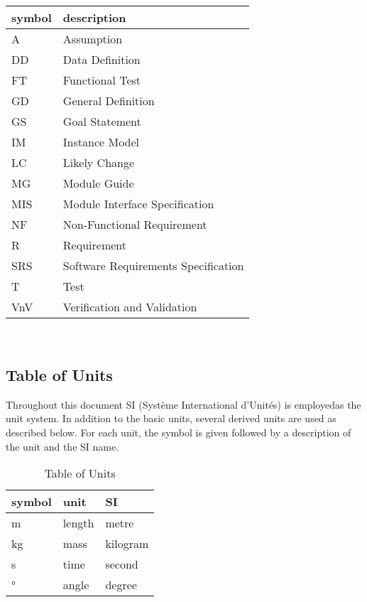 \documentclass[12pt, titlepage]{article}
\begin{document}
\renewcommand{\arraystretch}{1.2}
\begin{tabular}{l l} 
  \toprule		
  \textbf{symbol} & \textbf{description}\\
  \midrule 
  A & Assumption\\
  DD & Data Definition\\
  FT & Functional Test \\
  GD & General Definition\\
  GS & Goal Statement\\
  IM & Instance Model\\
  LC & Likely Change\\
  MG & Module Guide\\ 
  MIS & Module Interface Specification\\ 
  NF & Non-Functional Requirement\\
  R & Requirement\\
  SRS & Software Requirements Specification\\
  T & Test\\
  VnV & Verification and Validation\\ 
  \bottomrule
\end{tabular}\\

\subsection{Table of Units}

Throughout this document SI (Syst\`{e}me International d'Unit\'{e}s) is
employedas the unit system. In addition to the basic units, several derived
units are
used as described below.  For each unit, the symbol is given followed by a
description of the unit and the SI name.\\

\renewcommand{\arraystretch}{1.2}
\begin{table}[h!]
	\centering
\begin{center}
  \noindent \begin{tabular}{l l l} 
    \toprule		
    \textbf{symbol} & \textbf{unit} & \textbf{SI}\\
    \midrule 
    \si{\metre} & length & metre\\
    \si{\kilogram} & mass & kilogram\\
    \si{\second} & time & second\\
    \si{\degree} & angle & degree\\
    \bottomrule
  \end{tabular}
\end{center}
	\caption{Table of Units}
	\label{Table:R_trace}
\end{table}
\end{document}
